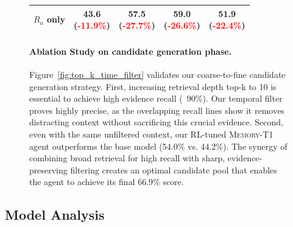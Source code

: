 \documentclass{article} %
\begin{document}
\begin{figure}[t]
\begin{minipage}[c]{0.48\textwidth}
{\begin{tabular}{lcccc}
    \midrule
    \quad $R_a$ only & 
        \makecell{43.6 \\ (\textcolor{red}{-11.9\%})} & 
        \makecell{57.5 \\ (\textcolor{red}{-27.7\%})} & 
        \makecell{59.0 \\ (\textcolor{red}{-26.6\%})} & 
        \makecell{51.9 \\ (\textcolor{red}{-22.4\%})} \\
    \bottomrule
\end{tabular}
}
\end{minipage}%
\hfill %
\begin{minipage}[c]{0.48\textwidth}
  \paragraph{Ablation Study on candidate generation phase.}  Figure~\ref{fig:top_k_time_filter} validates our coarse-to-fine candidate generation strategy. First, increasing retrieval depth top-k to 10 is essential to achieve high evidence recall (~90\%). Our temporal filter proves highly precise, as the overlapping recall lines show it removes distracting context without sacrificing this crucial evidence. Second, even with the same unfiltered context, our RL-tuned \textsc{Memory-T1} agent outperforms the base model (54.0\% vs. 44.2\%). The synergy of combining broad retrieval for high recall with sharp, evidence-preserving filtering creates an optimal candidate pool that enables the agent to achieve its final 66.9\% score.
\end{minipage}
\end{figure}





\subsection{Model Analysis}
\end{document}
